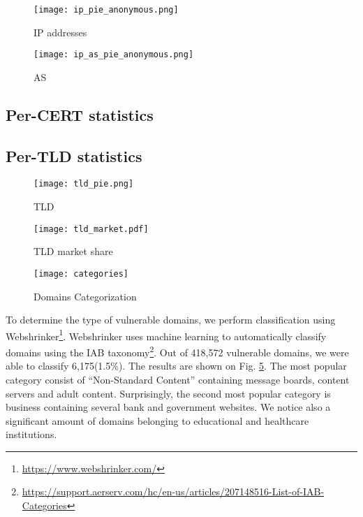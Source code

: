 \begin{figure}[!hbt]
\centering
\texttt{[image: ip\_pie\_anonymous.png]}
\caption{IP addresses}
\label{fig:ip_pie}
\end{figure}

\begin{figure}[!hbt]
\centering
\texttt{[image: ip\_as\_pie\_anonymous.png]}
\caption{AS}
\label{fig:ip_as_pie}
\end{figure}

\subsection{Per-CERT statistics}
\subsection{Per-TLD statistics}

\begin{figure}[!hbt]
\centering
\texttt{[image: tld\_pie.png]}
\caption{TLD}
\label{fig:tld_pie}
\end{figure}

\begin{figure}[!hbt]
\centering
\texttt{[image: tld\_market.pdf]}
\caption{TLD market share}
\label{fig:tld_market}
\end{figure}


\begin{figure}[!hbt]
\centering
\texttt{[image: categories]}
\caption{Domains Categorization}
\label{fig:categories}
\end{figure}

To determine the type of vulnerable domains, we perform classification using Webshrinker\footnote{\url{https://www.webshrinker.com/}}. Webshrinker uses machine learning to automatically classify domains using the IAB taxonomy\footnote{\url{https://support.aerserv.com/hc/en-us/articles/207148516-List-of-IAB-Categories}}. Out of 418,572 vulnerable domains, we were able to classify 6,175(1.5\%). 
The results are shown on Fig. \ref{fig:categories}. The most popular category consist of ``Non-Standard Content'' containing message boards, content servers and adult content. Surprisingly, the second most popular category is business containing several bank and government websites. We notice also a significant amount of domains belonging to educational and healthcare institutions. 

